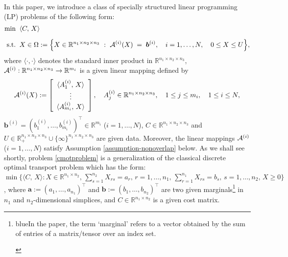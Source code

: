 \documentclass[10pt]{article}
\newcommand{\blue}[1]{\begin{color}{blue}#1\end{color}}
\newcommand{\red}[1]{\begin{color}{red}#1\end{color}}
\newcommand{\cA}{{\cal A}}
\newcommand{\inprod}[2]{\langle #1 , #2 \rangle }
\newcommand{\R}{\mathbb R}
\def\inprod#1#2{\langle#1,\,#2\rangle}
\begin{document}
In this paper,
we introduce a class of specially structured linear programming (LP) problems of the following form:
\begin{equation}\label{cmotproblem}
\begin{aligned}
\min & \;\;\inprod{C}{X} \\[5pt]
\mbox{s.t.} & \;\; X\in \Omega :  = \Big\{ X\in \R^{n_1\times n_2\times n_3} ~:~ \cA^{(i)} (X)  \;=\;
\bm{b}^{(i)}, \quad
i=1,\dots,N, \quad  0\leq X \leq U   \Big\},
\end{aligned}
\end{equation}
where $\langle\cdot,\cdot\rangle$ denotes the standard inner product in $\R^{n_1\times n_2\times n_3}$, $\cA^{(i)} : \R^{n_1\times n_2\times n_3} \to \R^{m_i}$ is a given linear mapping defined by
\begin{equation*}
\cA^{(i)}(X):=\left[ \begin{array}{c} \inprod{A^{(i)}_1}{X}\\ \vdots \\ \inprod{A^{(i)}_{m_i}}{X}
\end{array}\right], \quad
A_j^{(i)}\in \R^{n_1\times n_2\times n_3}, \quad 1\leq j\leq m_i, \quad 1\leq i\leq N,
\end{equation*}
$\bm{b}^{(i)}=(b^{(i)}_1,\dots,b^{(i)}_{m_i})^{\top}\in\mathbb{R}^{m_i}$ ($i=1,\dots,N$), $C\in\R^{n_1\times n_2 \times n_3} $ and $U\in\R_{+}^{n_1\times n_2\times n_3}\cup \{\infty\}^{n_1\times n_2\times n_3}$ are given data. Moreover, the linear mappings $\cA^{(i)}$ ($i=1,\dots,N$) satisfy Assumption \ref{assumption-nonoverlap} below. As we shall see shortly, problem \eqref{cmotproblem} is a generalization of the classical discrete optimal transport problem which has the form: $\min\big\{\inprod{C}{X} : X\in \R^{n_1\times n_2}, \,\sum_{s=1}^{n_2} X_{rs} = a_r, \,r=1,\ldots,n_1, \,\sum_{r=1}^{n_1} X_{rs} =
b_s, \,s=1,\ldots,n_2, \,X\geq0\big\}$, where $\bm{a}:=(a_1, \dots, a_{n_1})^{\top}$ and $\bm{b}:=(b_1, \dots, b_{n_2})^{\top}$ are two given marginals\footnote{\blue{In the paper, the term `marginal' refers to a vector obtained by the sum of entries of a matrix/tensor over an index set.}} in \(n_1\) and \(n_2\)-dimensional simplices, and $C\in \R^{n_1\times n_2}$ is a given cost matrix.
\end{document}
